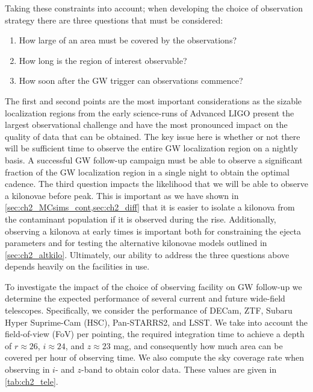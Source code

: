 Taking these constraints into account; when developing the choice of observation strategy there are three questions that must be considered:
\begin{enumerate}
\item How large of an area must be covered by the observations?
\item How long is the region of interest observable?
\item How soon after the GW trigger can observations commence?
\end{enumerate}

The first and second points are the most important considerations as the sizable localization regions from the early science-runs of Advanced LIGO present the largest observational challenge and have the most pronounced impact on the quality of data that can be obtained. The key issue here is whether or not there will be sufficient time to observe the entire GW localization region on a nightly basis. A successful GW follow-up campaign must be able to observe a significant fraction of the GW localization region in a single night to obtain the optimal cadence. The third question impacts the likelihood that we will be able to observe a kilonovae before peak. This is important as we have shown in \cref{sec:ch2_MCsims_cont,sec:ch2_diff} that it is easier to isolate a kilonova from the contaminant population if it is observed during the rise. Additionally, observing a kilonova at early times is important both for constraining the ejecta parameters and for testing the alternative kilonovae models outlined in \cref{sec:ch2_altkilo}. Ultimately, our ability to address the three questions above depends heavily on the facilities in use.

To investigate the impact of the choice of observing facility on GW follow-up we determine the expected performance of several current and future wide-field telescopes. Specifically, we consider the performance of DECam, ZTF, Subaru Hyper Suprime-Cam (HSC), Pan-STARRS2, and LSST. We take into account the field-of-view (FoV) per pointing, the required integration time to achieve a depth of $r\approx26$, $i\approx24$, and $z\approx23$ mag, and consequently how much area can be covered per hour of observing time. We also compute the sky coverage rate when observing in $i$- and $z$-band to obtain color data. These values are given in \cref{tab:ch2_tele}.


